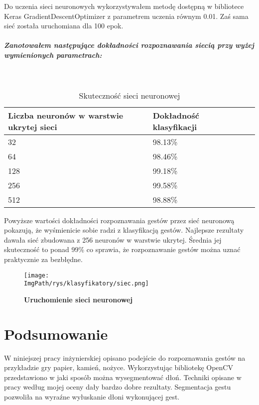 \documentclass[a4paper,12pt,twoside,openany]{report}
\newcommand{\ImgPath}{.}
\begin{document}
	Do uczenia sieci neuronowych wykorzystywałem metodę dostępną w bibliotece Keras GradientDescentOptimizer z parametrem uczenia równym 0.01. Zaś sama sieć została uruchomiana dla 100 epok. 
	
	\paragraph{Zanotowałem następujące dokładności rozpoznawania siecią przy wyżej wymienionych parametrach:}
	
	\mbox{}\\
	
	\begin{table}[H]
		\centering
		\begin{tabularx}{\textwidth}{|X|X|X|X|}
			\hline
			\textbf{Liczba neuronów w warstwie ukrytej sieci} & \textbf{Dokładność klasyfikacji} \\ 
			
			\hline
			32  & 98.13\% \\ 
			
			\hline
			64  & 98.46\% \\
			
			\hline
			128  & 99.18\% \\
			
			\hline
			256  & 99.58\% \\
			
			\hline
			512  & 98.88\% \\
			
			\hline
		\end{tabularx}
		
		\caption{Skuteczność sieci neuronowej}
	\end{table}

	Powyższe wartości dokładności rozpoznawania gestów przez sieć neuronową pokazują, że wyśmienicie sobie radzi z klasyfikacją gestów. Najlepsze rezultaty dawała sieć zbudowana z 256 neuronów w warstwie ukrytej. Średnia jej skuteczność to ponad 99\% co sprawia, że rozpoznawanie gestów można uznać praktycznie za bezbłędne. 
	
	\begin{figure}[H]
		\centering
		{\label{fig:b}\texttt{[image: \\ImgPath/rys/klasyfikatory/siec.png]}}
		\caption{  \textbf{Uruchomienie sieci neuronowej}}
	\end{figure}
	

\chapter{Podsumowanie}
	W niniejszej pracy inżynierskiej opisano podejście do rozpoznawania gestów na przykładzie gry papier, kamień, nożyce. Wykorzystując bibliotekę OpenCV przedstawiono w jaki sposób można wysegmentować dłoń. Techniki opisane w pracy według mojej oceny dały bardzo dobre rezultaty. Segmentacja gestu pozwoliła na wyraźne wyłuskanie dłoni wykonującej gest.
	
\end{document}

